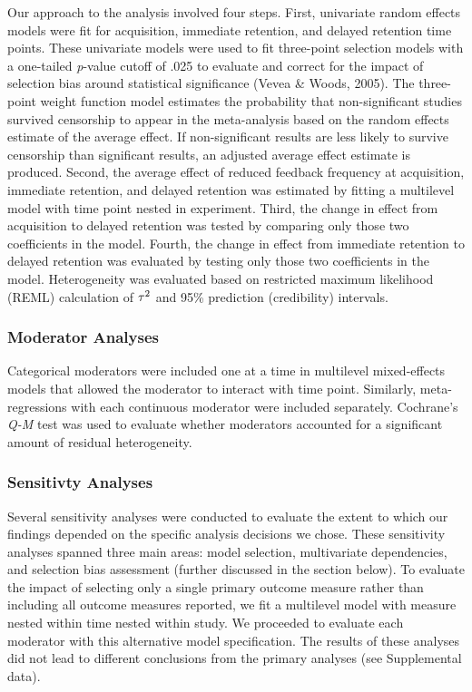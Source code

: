 \documentclass[
  english,
  man, donotrepeattitle,mask,floatsintext]{apa7}
\begin{document}
Our approach to the analysis involved four steps. First, univariate random effects models were fit for acquisition, immediate retention, and delayed retention time points. These univariate models were used to fit three-point selection models with a one-tailed \emph{p}-value cutoff of .025 to evaluate and correct for the impact of selection bias around statistical significance (Vevea \& Woods, 2005). The three-point weight function model estimates the probability that non-significant studies survived censorship to appear in the meta-analysis based on the random effects estimate of the average effect. If non-significant results are less likely to survive censorship than significant results, an adjusted average effect estimate is produced. Second, the average effect of reduced feedback frequency at acquisition, immediate retention, and delayed retention was estimated by fitting a multilevel model with time point nested in experiment. Third, the change in effect from acquisition to delayed retention was tested by comparing only those two coefficients in the model. Fourth, the change in effect from immediate retention to delayed retention was evaluated by testing only those two coefficients in the model. Heterogeneity was evaluated based on restricted maximum likelihood (REML) calculation of \(\small\tau^2\) and 95\% prediction (credibility) intervals.

\hypertarget{moderator-analyses}{%
\subsubsection{Moderator Analyses}\label{moderator-analyses}}

Categorical moderators were included one at a time in multilevel mixed-effects models that allowed the moderator to interact with time point. Similarly, meta-regressions with each continuous moderator were included separately. Cochrane's \emph{Q-M} test was used to evaluate whether moderators accounted for a significant amount of residual heterogeneity.

\hypertarget{sensitivty-analyses}{%
\subsubsection{Sensitivty Analyses}\label{sensitivty-analyses}}

Several sensitivity analyses were conducted to evaluate the extent to which our findings depended on the specific analysis decisions we chose. These sensitivity analyses spanned three main areas: model selection, multivariate dependencies, and selection bias assessment (further discussed in the section below). To evaluate the impact of selecting only a single primary outcome measure rather than including all outcome measures reported, we fit a multilevel model with measure nested within time nested within study. We proceeded to evaluate each moderator with this alternative model specification. The results of these analyses did not lead to different conclusions from the primary analyses (see Supplemental data).
\end{document}
